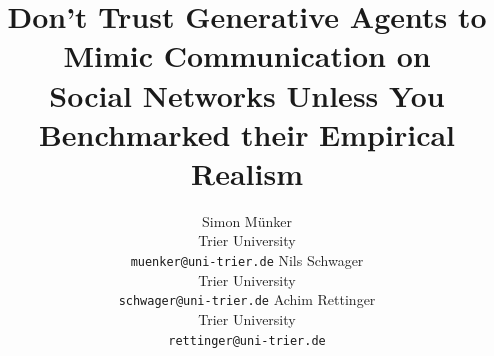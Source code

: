 \title{
    Don't Trust Generative Agents to Mimic Communication on \\
    Social Networks Unless You Benchmarked their Empirical Realism
}

\author{
    Simon Münker \\
    Trier University \\
    \texttt{muenker@uni-trier.de} 
\And
  Nils Schwager \\
  Trier University \\
  \texttt{schwager@uni-trier.de}
\And
  Achim Rettinger \\
  Trier University \\
  \quad\texttt{rettinger@uni-trier.de}
}
